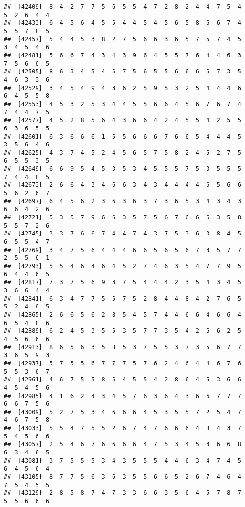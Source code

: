 \documentclass[
]{book}
\begin{document}
\begin{verbatim}
##  [42409]  8  4  2  7  7  5  6  5  5  4  7  2  8  2  4  4  7  5  4  5  2  6  4  4
##  [42433]  6  4  5  6  4  5  5  4  4  5  4  5  6  5  8  6  6  7  4  5  5  7  8  5
##  [42457]  5  4  4  5  3  8  2  7  5  6  6  3  6  5  7  5  7  4  5  3  4  5  4  6
##  [42481]  5  6  6  7  4  3  4  3  9  6  4  5  5  7  6  4  4  6  3  7  5  6  6  5
##  [42505]  8  6  3  4  5  4  5  7  5  6  5  5  6  6  6  6  7  3  5  4  6  3  3  6
##  [42529]  3  4  5  4  9  4  3  6  2  5  9  5  3  2  5  4  4  4  6  6  4  5  5  8
##  [42553]  4  5  3  2  5  3  4  4  5  5  6  6  4  5  6  7  6  7  4  7  4  4  7  5
##  [42577]  4  5  2  8  5  6  4  3  6  6  4  2  4  5  5  4  2  5  5  6  3  6  5  5
##  [42601]  6  3  6  6  6  1  5  5  6  6  6  7  6  6  5  4  4  4  5  3  5  6  4  6
##  [42625]  4  3  7  4  5  2  4  5  6  5  7  5  8  2  4  5  2  7  5  6  5  5  3  5
##  [42649]  6  6  9  5  4  5  3  5  3  4  5  5  5  7  5  3  5  5  5  7  4  4  8  5
##  [42673]  2  6  6  4  3  4  6  6  3  4  3  4  4  4  4  6  5  6  6  5  6  2  6  7
##  [42697]  6  4  5  6  2  3  6  3  6  3  7  3  6  5  3  4  3  4  3  6  6  4  2  6
##  [42721]  5  3  5  7  9  6  6  3  5  7  5  6  7  6  6  6  3  5  8  5  5  7  2  6
##  [42745]  3  3  7  6  6  7  4  4  7  4  3  7  5  3  6  3  8  4  5  6  5  5  4  7
##  [42769]  3  4  7  5  6  4  4  4  6  6  5  6  5  6  7  3  5  7  7  2  5  5  6  1
##  [42793]  5  5  4  6  4  6  4  5  2  7  4  6  3  5  4  7  7  9  5  6  4  4  6  5
##  [42817]  7  3  7  5  6  9  3  7  5  4  4  4  2  3  5  4  3  4  5  3  6  6  4  4
##  [42841]  6  3  4  7  7  5  5  7  5  2  8  4  4  8  4  2  7  6  5  5  2  4  6  5
##  [42865]  2  6  6  5  6  2  8  5  4  5  7  4  4  6  6  4  6  6  4  6  5  4  8  6
##  [42889]  6  2  4  5  3  5  5  3  5  7  7  3  5  4  2  6  6  2  5  4  5  6  6  6
##  [42913]  8  6  5  6  3  5  8  5  3  7  5  5  3  7  3  5  6  7  7  3  6  5  9  3
##  [42937]  5  7  5  5  6  7  7  7  5  7  6  2  4  6  4  4  6  7  6  5  5  3  6  7
##  [42961]  4  6  7  5  5  8  5  4  5  5  4  2  8  6  4  5  3  6  6  4  5  4  5  6
##  [42985]  4  1  6  2  4  3  4  5  7  6  3  6  4  3  6  6  7  7  7  6  6  7  5  6
##  [43009]  5  2  7  5  3  4  6  6  6  4  5  3  5  5  7  2  5  4  7  4  6  7  5  8
##  [43033]  5  5  4  7  5  5  2  6  7  4  7  6  6  6  4  8  4  3  7  5  4  5  6  6
##  [43057]  2  5  4  6  7  6  6  6  6  4  7  5  3  4  5  3  6  6  8  6  3  4  6  5
##  [43081]  3  7  5  5  5  3  4  3  5  5  5  4  4  6  3  4  7  4  5  6  4  5  6  4
##  [43105]  8  7  7  5  6  3  6  3  5  5  6  6  5  2  6  7  4  6  4  7  5  4  5  5
##  [43129]  2  8  5  8  7  4  7  3  3  6  6  3  5  6  4  5  7  8  7  5  5  6  6  6

\end{verbatim}
\end{document}
